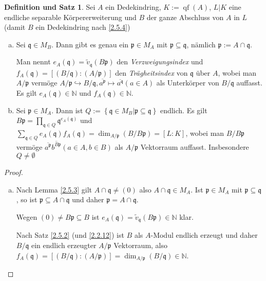 \documentclass[
twoside=semi,
fontsize=12,
DIV=12, 
cleardoublepage=current,
leqno,
headings=optiontoheadandtoc, 
toc=idx
]{scrbook}
\newcommand{\N}{\mathbb{N}}
\newcommand{\set}[1]{\left\{ #1 \right\}}
\DeclareMathOperator{\qf}{qf}
\theoremstyle{definition}
\newtheorem{def-satz}[definition]{Definition und Satz}
\begin{document}
 	\begin{def-satz}
 		Sei $A$ ein Dedekindring, $K:= \qf(A)$, $L|K$ eine endliche separable K\"orpererweiterung und $B$ der ganze Abschluss von $A$ in $L$ (damit $B$ ein Dedekindring nach \ref{2.5.4})
 		
 		\begin{enumerate}[(a)]
 			\item 
 			Sei $\mathfrak{q} \in M_B$. Dann gibt es genau ein $\mathfrak{p} \in M_A$ mit $\mathfrak{p} \subseteq \mathfrak{q}$, n\"amlich $\mathfrak{p} := A \cap \mathfrak{q}$.
 			
 			Man nennt $e_A(\mathfrak{q}) = \tilde{v}_\mathfrak{q}(B\mathfrak{p})$ den \emph{Verzweigungsindex} und $f_A(\mathfrak{q}) = [(B/\mathfrak{q}):(A/\mathfrak{p})]$ den \emph{Tr\"agheitsindex} von $\mathfrak{q}$ \"uber $A$, wobei man $A/\mathfrak{p}$ verm\"oge $A/\mathfrak{p} \hookrightarrow B/ \mathfrak{q}, \overline{a^\mathfrak{p}} \mapsto \overline{a^\mathfrak{q}} (a \in A)$ als Unterk\"orper von $B/\mathfrak{q}$ auffasst. Es gilt $e_A(\mathfrak{q}) \in \N$ und $f_A(\mathfrak{q}) \in \N$.
 			
 			\item 
 			Sei $\mathfrak{p} \in M_A$. Dann ist $Q:= \set{\mathfrak{q} \in M_B| \mathfrak{p} \subseteq \mathfrak{q}}$ endlich. Es gilt $B\mathfrak{p} = \prod_{\mathfrak{q} \in Q} \mathfrak{q}^{e_A(\mathfrak{q})}$ und 
 			$\sum_{\mathfrak{q} \in Q} e_A(\mathfrak{q})f_A(\mathfrak{q}) = \dim_{A/\mathfrak{p}}(B/B\mathfrak{p}) = [L:K]$, wobei man $B/B\mathfrak{p}$ verm\"oge $\overline{a^\mathfrak{p}}\overline{b^{B\mathfrak{p}}} (a \in A, b \in B)$ als $A/\mathfrak{p}$ Vektorraum auffasst. Insbesondere $Q \neq \emptyset$
 		\end{enumerate}
 	
 		\begin{proof}
 			\begin{enumerate}[(a)]
 				\item 
 				Nach Lemma \ref{2.5.3} gilt $A \cap \mathfrak{q} \neq (0)$ also $A \cap \mathfrak{q} \in M_A$. Ist $\mathfrak{p} \in M_A$ mit $\mathfrak{p} \subseteq \mathfrak{q}$, so ist $\mathfrak{p} \subseteq A \cap \mathfrak{q}$ und daher $\mathfrak{p} = A \cap \mathfrak{q}$.
 				
 				Wegen $(0) \neq B\mathfrak{p} \subseteq B$ ist $e_A(\mathfrak{q}) = \tilde{v}_\mathfrak{q}(B\mathfrak{p}) \in \N$ klar.
 				
 				Nach Satz \ref{2.5.2} (und \ref{2.2.12}) ist $B$ als $A$-Modul endlich erzeugt und daher $B/\mathfrak{q}$ ein endlich erzeugter  $A/\mathfrak{p}$ Vektorraum, also $f_A(\mathfrak{q}) = [(B/\mathfrak{q}):(A/\mathfrak{p})] = \dim_{A/\mathfrak{p}}(B/\mathfrak{q} ) \in \N$.
 				

\end{enumerate}
\end{proof}
\end{def-satz}
\end{document}
